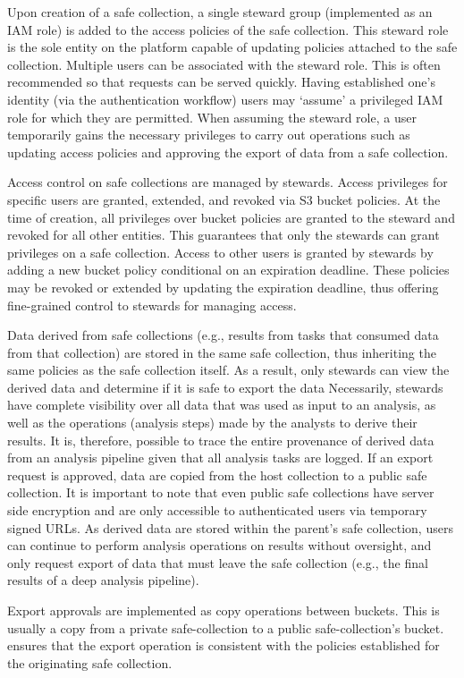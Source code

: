 Upon creation of a safe collection, a single steward group (implemented as an IAM role) is added to the
access policies of the safe collection. This steward role is the sole entity on the platform capable of
updating policies attached to the safe collection.
Multiple users can be associated with the steward role. This is often recommended so
that requests can be served quickly.
Having established one's identity (via the \NAME authentication workflow) users
may `assume' a privileged IAM role for which they are permitted.
When assuming the steward role, a user temporarily gains the necessary privileges to carry out operations such
as updating access policies and approving the export of data from a safe collection.

Access control on safe collections are managed by stewards. Access privileges for specific users
are granted, extended, and revoked via S3 bucket policies. At the time of creation, all
privileges over bucket policies are granted to the steward and revoked for all other entities. This
guarantees that only the stewards can grant privileges on a safe collection. Access to other users
is granted by stewards by adding a new bucket policy conditional on an expiration deadline. These policies may be revoked or
extended by updating the expiration deadline, thus offering fine-grained control to stewards for managing
access.

Data derived from safe collections (e.g., results from tasks that consumed data from that collection)
are stored in the same safe collection, thus inheriting the same policies as the safe collection itself.
As a result, only stewards can view the derived data and determine if it is safe to
export the data
Necessarily, stewards have complete visibility over all data that was used as input to an analysis, as
well as the operations (analysis steps) made by the analysts to derive their results.
It is, therefore, possible to trace the entire provenance of derived data from an
analysis pipeline given that all analysis tasks are logged.
If an export request is approved, data are copied from the host collection to a public safe collection.
It is important to note that even public safe collections have server side encryption and
are only accessible to authenticated users via temporary signed URLs.
As derived data are stored within the parent's safe collection, users can continue
to perform analysis operations on results without oversight,
and only request export of data that must leave the safe collection (e.g., the
final results of a deep analysis pipeline).

Export approvals are implemented as copy operations between buckets. This is usually a copy from a
private safe-collection to a public safe-collection's bucket.
\NAME ensures that the export operation is consistent with the policies established for the originating
safe collection.


